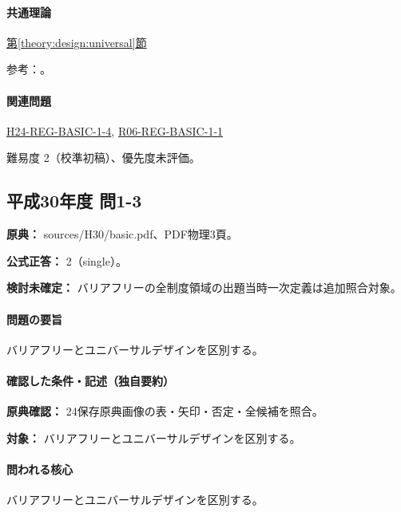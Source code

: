 \paragraph{共通理論} \hyperref[theory:design:universal]{第\ref*{theory:design:universal}節}

\par 参考：\cite{design48_ud}。

\paragraph{関連問題} \hyperref[q:h24-reg-basic-1-4]{H24-REG-BASIC-1-4}, \hyperref[q:r06-reg-basic-1-1]{R06-REG-BASIC-1-1}

\par 難易度 2（校準初稿）、優先度未評価。

\subsection{平成30年度 問1-3}
\label{q:h30-reg-basic-1-3}

\noindent\textbf{原典：} sources/H30/basic.pdf、PDF物理3頁。

\textbf{公式正答：} 2（single）。

\par\textbf{検討未確定：} バリアフリーの全制度領域の出題当時一次定義は追加照合対象。

\paragraph{問題の要旨} バリアフリーとユニバーサルデザインを区別する。

\paragraph{確認した条件・記述（独自要約）}\mbox{}\par

\noindent\textbf{原典確認：} 24保存原典画像の表・矢印・否定・全候補を照合。\par

\noindent\textbf{対象：} バリアフリーとユニバーサルデザインを区別する。\par

\paragraph{問われる核心} バリアフリーとユニバーサルデザインを区別する。

